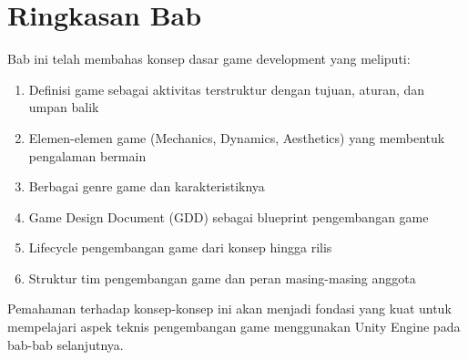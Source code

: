 \section{Ringkasan Bab}

Bab ini telah membahas konsep dasar game development yang meliputi:
\begin{enumerate}
\item Definisi game sebagai aktivitas terstruktur dengan tujuan, aturan, dan umpan balik
\item Elemen-elemen game (Mechanics, Dynamics, Aesthetics) yang membentuk pengalaman bermain
\item Berbagai genre game dan karakteristiknya
\item Game Design Document (GDD) sebagai blueprint pengembangan game
\item Lifecycle pengembangan game dari konsep hingga rilis
\item Struktur tim pengembangan game dan peran masing-masing anggota
\end{enumerate}

Pemahaman terhadap konsep-konsep ini akan menjadi fondasi yang kuat untuk mempelajari aspek teknis pengembangan game menggunakan Unity Engine pada bab-bab selanjutnya.
